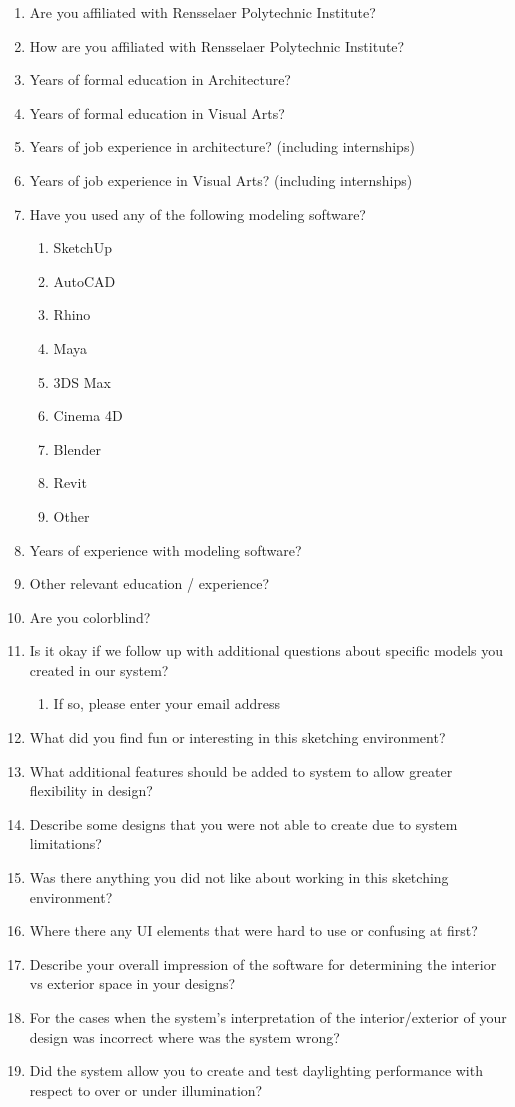 \begin{enumerate}  
\item Are you affiliated with Rensselaer Polytechnic Institute? 
\item How are you affiliated with Rensselaer Polytechnic Institute?
\item Years of formal education in Architecture?
\item Years of formal education in Visual Arts?
\item Years of job experience in architecture? (including internships) 
\item Years of job experience in Visual Arts? (including internships)
\item Have you used any of the following modeling software?
\begin{enumerate}  
  \item SketchUp
  \item AutoCAD
  \item Rhino
  \item Maya
  \item 3DS Max
  \item Cinema 4D
  \item Blender
  \item Revit
  \item Other
\end{enumerate}
\item Years of experience with modeling software?
\item Other relevant education / experience?
\item Are you colorblind?
\item Is it okay if we follow up with additional questions about specific models you created in our system?
  \begin{enumerate}
    \item If so, please enter your email address
  \end{enumerate}

\item What did you find fun or interesting in this sketching environment?
\item What additional features should be added to system to allow greater flexibility in design?
\item Describe some designs that you were not able to create due  to system limitations?
\item Was there anything you did not like about working in this sketching environment?
\item Where there any UI elements that were hard to use or confusing at first?

\item Describe your overall impression of the software for determining the interior vs exterior space in your designs?
\item For the cases when the system’s interpretation of the interior/exterior of your design was incorrect where was the system wrong? 
\item Did the system allow you to create and test daylighting performance with respect to over or under illumination?

\end{enumerate}

